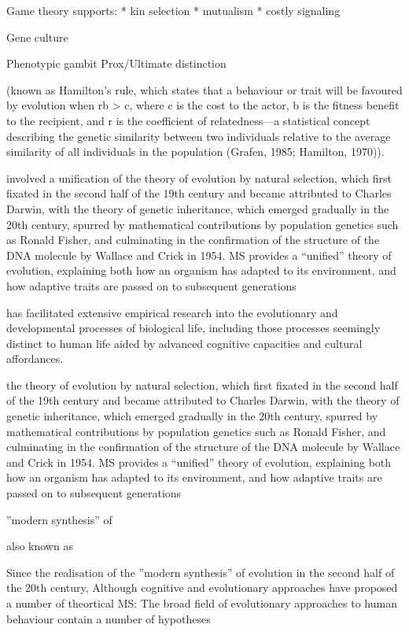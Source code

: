 Game theory supports:
* kin selection
* mutualism
* costly signaling


Gene culture

Phenotypic gambit
Prox/Ultimate distinction







(known as Hamilton’s rule, which states that a behaviour or trait will be favoured by evolution when rb > c, where c is the cost to the actor, b is the fitness benefit to the recipient, and r is the coefficient of relatedness—a statistical concept describing the genetic similarity between two individuals relative to the average similarity of all individuals in the population (Grafen, 1985; Hamilton, 1970)).


involved a unification of the theory of evolution by natural selection, which first fixated in the second half of the 19th century and became attributed to Charles Darwin, with the theory of genetic inheritance, which emerged gradually in the 20th century, spurred by mathematical contributions by population genetics such as Ronald Fisher, and culminating in the confirmation of the structure of the DNA molecule by Wallace and Crick in 1954.  MS provides a ``unified'' theory of evolution, explaining both how an organism has adapted to its environment, and how adaptive traits are passed on to subsequent generations

 has facilitated extensive empirical research into the evolutionary and developmental processes of biological life, including those processes seemingly distinct to human life aided by advanced cognitive capacities and cultural affordances.

the theory of evolution by natural selection, which first fixated in the second half of the 19th century and became attributed to Charles Darwin, with the theory of genetic inheritance, which emerged gradually in the 20th century, spurred by mathematical contributions by population genetics such as Ronald Fisher, and culminating in the confirmation of the structure of the DNA molecule by Wallace and Crick in 1954.  MS provides a ``unified'' theory of evolution, explaining both how an organism has adapted to its environment, and how adaptive traits are passed on to subsequent generations




 ''modern synthesis'' of

also known as

Since the realisation of the ''modern synthesis'' of evolution in the second half of the 20th century,
Although cognitive and evolutionary approaches have proposed a number of theortical
MS:
The broad field of evolutionary approaches to human behaviour contain a number of hypotheses


